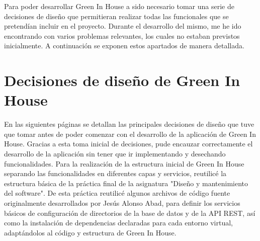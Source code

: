 Para poder desarrollar Green In House a sido necesario tomar una serie de decisiones de diseño que permitieran realizar todas las funcionales que se pretendían incluir en el proyecto. Durante el desarrollo del mismo, me he ido encontrando con varios problemas relevantes, los cuales no estaban previstos inicialmente. A continuación se exponen estos apartados de manera detallada.

\section{Decisiones de diseño de Green In House}
En las siguientes páginas se detallan las principales decisiones de diseño que tuve que tomar antes de poder comenzar con el desarrollo de la aplicación de Green In House. Gracias a esta toma inicial de decisiones, pude encauzar correctamente el desarrollo de la aplicación sin tener que ir implementando y desechando funcionalidades. Para la realización de la estructura inicial de Green In House separando las funcionalidades en diferentes capas y servicios, reutilicé la estructura básica de la práctica final de la asignatura "Diseño y mantenimiento del software". De esta práctica reutilicé algunos archivos de código fuente originalmente desarrollados por Jesús Alonso Abad, para definir los servicios básicos de configuración de directorios de la base de datos y de la API REST, así como la instalación de dependencias declaradas para cada entorno virtual, adaptándolos al código y estructura de Green In House.

